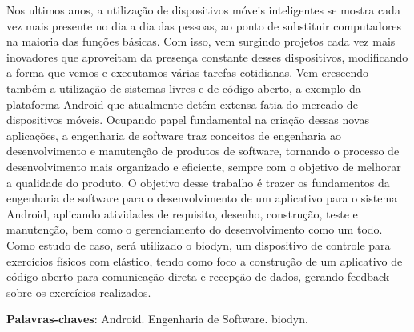 \begin{resumo}

Nos ultimos anos, a utilização de dispositivos móveis inteligentes se mostra cada vez mais presente no dia a dia das pessoas, ao ponto de substituir computadores na maioria das funções básicas. Com isso, vem surgindo projetos cada vez mais inovadores que aproveitam da presença constante desses dispositivos, modificando a forma que vemos e executamos várias tarefas cotidianas. Vem crescendo também a utilização de sistemas livres e de código aberto, a exemplo da plataforma Android que atualmente detém extensa fatia do mercado de dispositivos móveis. Ocupando papel fundamental na criação dessas novas aplicações, a engenharia de software traz conceitos de engenharia ao desenvolvimento e manutenção de produtos de software, tornando o processo de desenvolvimento mais organizado e eficiente, sempre com o objetivo de melhorar a qualidade do produto. O objetivo desse trabalho é trazer os fundamentos da engenharia de software para o desenvolvimento de um aplicativo para o sistema Android, aplicando atividades de requisito, desenho, construção, teste e manutenção, bem como o gerenciamento do desenvolvimento como um todo. Como estudo de caso, será utilizado o biodyn, um dispositivo de controle para exercícios físicos com elástico, tendo como foco a construção de um aplicativo de código aberto para comunicação direta e recepção de dados, gerando feedback sobre os exercícios realizados.

\vspace{\onelineskip}
    
 \noindent
 \textbf{Palavras-chaves}: Android. Engenharia de Software. biodyn.

\end{resumo}
